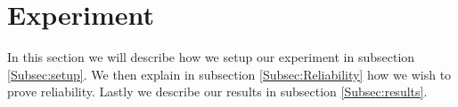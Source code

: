 \section{Experiment}\label{Sec:Experiment}
In this section we will describe how we setup our experiment in subsection \ref{Subsec:setup}. We then explain in subsection \ref{Subsec:Reliability} how we wish to prove reliability. Lastly we describe our results in subsection \ref{Subsec:results}.



